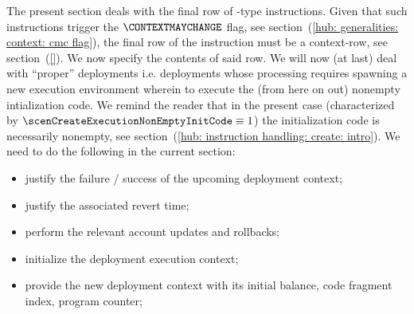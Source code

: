 \begin{center}
\end{center}
The present section deals with the final row of -type instructions.
Given that such instructions trigger the $\CONTEXTMAYCHANGE$ flag, see section~(\ref{hub: generalities: context: cmc flag}), the final row of the instruction must be a context-row, see section~(\ref{}).
We now specify the contents of said row.
We will now (at last) deal with ``proper'' deployments i.e. deployments whose processing requires spawning a new execution environment wherein to execute the (from here on out) nonempty intialization code. We remind the reader that in the present case (characterized by $\scenCreateExecutionNonEmptyInitCode \equiv 1$) the initialization code is necessarily nonempty, see section~(\ref{hub: instruction handling: create: intro}). We need to do the following in the current section:
\begin{itemize}
	\item justify the failure / success of the upcoming deployment context;
	\item justify the associated revert time;
	\item perform the relevant account updates and rollbacks;
	\item initialize the deployment execution context; 
	\item provide the new deployment context with its initial balance, code fragment index, program counter; 
\end{itemize}

